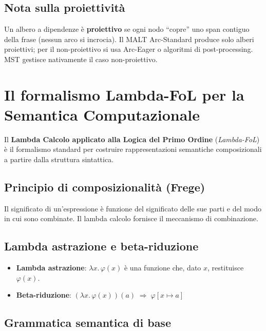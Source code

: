 \documentclass[12pt,a4paper]{article}
\begin{document}
\subsection{Nota sulla proiettività}
Un albero a dipendenze è \textbf{proiettivo} se ogni nodo ``copre'' uno span contiguo della frase (nessun arco si incrocia). Il MALT Arc-Standard produce solo alberi proiettivi; per il non-proiettivo si usa Arc-Eager o algoritmi di post-processing. MST gestisce nativamente il caso non-proiettivo.

\section{Il formalismo Lambda-FoL per la Semantica Computazionale}

Il \textbf{Lambda Calcolo applicato alla Logica del Primo Ordine} (\emph{Lambda-FoL}) è il formalismo standard per costruire rappresentazioni semantiche composizionali a partire dalla struttura sintattica.

\subsection{Principio di composizionalità (Frege)}

Il significato di un'espressione è funzione del significato delle sue parti e del modo in cui sono combinate. Il lambda calcolo fornisce il meccanismo di combinazione.

\subsection{Lambda astrazione e beta-riduzione}

\begin{defbox}
\begin{itemize}[leftmargin=1.5em]
  \item \textbf{Lambda astrazione}: $\lambda x.\,\varphi(x)$ è una funzione che, dato $x$, restituisce $\varphi(x)$.
  \item \textbf{Beta-riduzione}: $(\lambda x.\,\varphi(x))(a) \;\Rightarrow\; \varphi[x \mapsto a]$
\end{itemize}
\end{defbox}

\subsection{Grammatica semantica di base}
\end{document}

